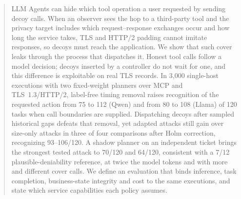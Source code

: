 \begin{abstract}
LLM Agents can hide which tool operation a user requested by sending decoy calls. When an observer sees the hop to a third-party tool and the privacy target includes which request--response exchanges occur and how long the service takes, TLS and HTTP/2 padding cannot imitate responses, so decoys must reach the application. We show that such cover leaks through the process that dispatches it. Honest tool calls follow a model decision; decoys inserted by a controller do not wait for one, and this difference is exploitable on real TLS records. In 3,000 single-host executions with two fixed-weight planners over MCP and TLS~1.3/HTTP/2, label-free timing removal raises recognition of the requested action from 75 to 112 (Qwen) and from 80 to 108 (Llama) of 120 tasks when call boundaries are supplied. Dispatching decoys after sampled historical gaps defeats that removal, yet adapted attacks still gain over size-only attacks in three of four comparisons after Holm correction, recognizing 93--106/120. A shadow planner on an independent ticket brings the strongest tested attack to 70/120 and 64/120, consistent with a 7/12 plausible-deniability reference, at twice the model tokens and with more and different cover calls. We define an evaluation that binds inference, task completion, business-state integrity and cost to the same executions, and state which service capabilities each policy assumes.
\end{abstract}
